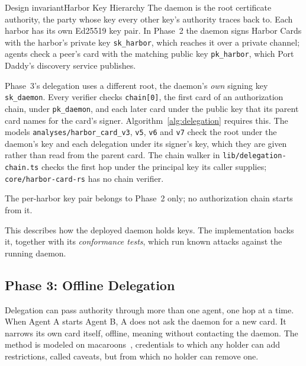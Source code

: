 \documentclass[11pt,a4paper]{article}
\theoremstyle{definition}
\begin{document}
\begin{pdclaim}{Design invariant}{Harbor Key Hierarchy}
\setlength{\parskip}{4pt plus 1pt}
\label{def:anchor-key-hierarchy}
The daemon is the root certificate authority, the party whose key every other key's authority traces back to. Each harbor has its own Ed25519 key pair. In Phase~2 the daemon signs Harbor Cards with the harbor's private key \texttt{sk\_harbor}, which reaches it over a private channel; agents check a peer's card with the matching public key \texttt{pk\_harbor}, which Port Daddy's discovery service publishes.

Phase~3's delegation uses a different root, the daemon's \emph{own} signing key \texttt{sk\_daemon}. Every verifier checks \texttt{chain[0]}, the first card of an authorization chain, under \texttt{pk\_daemon}, and each later card under the public key that its parent card names for the card's signer. Algorithm~\ref{alg:delegation} requires this. The models \texttt{analyses/harbor\_card\_v3}, \texttt{v5}, \texttt{v6} and \texttt{v7} check the root under the daemon's key and each delegation under its signer's key, which they are given rather than read from the parent card. The chain walker in \texttt{lib/delegation-chain.ts} checks the first hop under the principal key its caller supplies; \texttt{core/harbor-card-rs} has no chain verifier.

The per-harbor key pair belongs to Phase~2 only; no authorization chain starts from it.

This describes how the deployed daemon holds keys. The implementation backs it, together with its \emph{conformance tests}, which run known attacks against the running daemon.
\end{pdclaim}

\subsection{Phase 3: Offline Delegation}

Delegation can pass authority through more than one agent, one hop at a time. When Agent A starts Agent B, A does not ask the daemon for a new card. It narrows its own card itself, offline, meaning without contacting the daemon. The method is modeled on macaroons~, credentials to which any holder can add restrictions, called caveats, but from which no holder can remove one.
\end{document}
